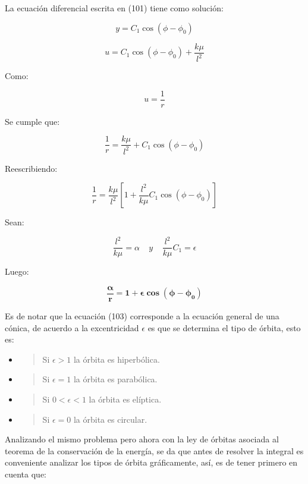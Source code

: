 \documentclass[]{article}
\begin{document}
La ecuación diferencial escrita en (101) tiene como solución:

\[y = C_{1}\cos\left( \phi - \phi_{0} \right)\]

\[u = C_{1}\cos{\left( \phi - \phi_{0} \right) + \frac{k\mu}{l^{2}}}\]

Como:

\[u = \frac{1}{r}\]

Se cumple que:

\[\frac{1}{r} = \frac{k\mu}{l^{2}} + C_{1}\cos\left( \phi - \phi_{0} \right)\]

Reescribiendo:

\[\frac{1}{r} = \frac{k\mu}{l^{2}}\left\lbrack 1 + \frac{l^{2}}{k\mu}C_{1}\cos\left( \phi - \phi_{0} \right) \right\rbrack\]

Sean:

\[\frac{l^{2}}{k\mu} = \alpha\ \ \ \ \ y\ \ \ \ \ \frac{l^{2}}{k\mu}C_{1} = \epsilon\]

Luego:

\[\frac{\mathbf{\alpha}}{\mathbf{r}}\mathbf{= 1 + \epsilon}\mathbf{\cos}\left( \mathbf{\phi -}\mathbf{\phi}_{\mathbf{0}} \right)\]

Es de notar que la ecuación (103) corresponde a la ecuación general de
una cónica, de acuerdo a la excentricidad \(\epsilon\) es que se
determina el tipo de órbita, esto es:

\begin{itemize}
\item
  \begin{quote}
  Si \(\epsilon > 1\) la órbita es hiperbólica.
  \end{quote}
\item
  \begin{quote}
  Si \(\epsilon = 1\) la órbita es parabólica.
  \end{quote}
\item
  \begin{quote}
  Si \(0 < \epsilon < 1\) la órbita es elíptica.
  \end{quote}
\item
  \begin{quote}
  Si \(\epsilon = 0\) la órbita es circular.
  \end{quote}
\end{itemize}

Analizando el mismo problema pero ahora con la ley de órbitas asociada
al teorema de la conservación de la energía, se da que antes de resolver
la integral es conveniente analizar los tipos de órbita gráficamente,
así, es de tener primero en cuenta que:
\end{document}
